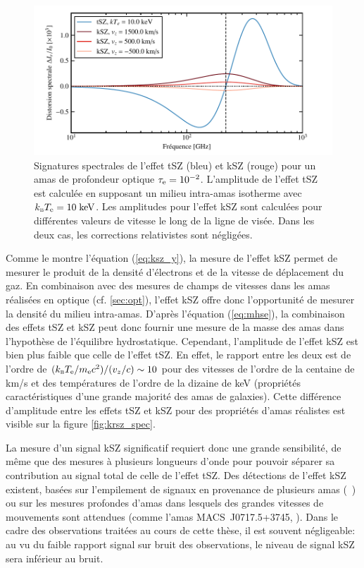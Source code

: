 \begin{figure}[t]
    \centering
    \includegraphics[width=.8\linewidth]{Figures/Chap_amas/tSZ_kSZ_spectrum.pdf}
    \caption{
        Signatures spectrales de l'effet tSZ (bleu) et kSZ (rouge) pour un amas de profondeur optique $\tau_{\rm e} = 10^{-2}$.
        L'amplitude de l'effet tSZ est calculée en supposant un milieu intra-amas isotherme avec $k_\textsc{b} T_{\rm e} = 10\;{\rm keV}$.
        Les amplitudes pour l'effet kSZ sont calculées pour différentes valeurs de vitesse le long de la ligne de visée.
        Dans les deux cas, les corrections relativistes sont négligées.
    }
    \label{fig:ksz_spec}
\end{figure}

Comme le montre l'équation (\ref{eq:ksz_y}), la mesure de l'effet kSZ permet de mesurer le produit de la densité d'électrons et de la vitesse de déplacement du gaz.
En combinaison avec des mesures de champs de vitesses dans les amas réalisées en optique (cf. \ref{sec:opt}), l'effet kSZ offre donc l'opportunité de mesurer la densité du milieu intra-amas.
D'après l'équation (\ref{eq:mhse}), la combinaison des effets tSZ et kSZ peut donc fournir une mesure de la masse des amas dans l'hypothèse de l'équilibre hydrostatique.
Cependant, l'amplitude de l'effet kSZ est bien plus faible que celle de l'effet tSZ.
En effet, le rapport entre les deux est de l'ordre de $(k_\textsc{b} T_{\rm e} / m_{\rm e} c^2) / (v_z / c) \sim 10$ pour des vitesses de l'ordre de la centaine de km/s et des températures de l'ordre de la dizaine de keV (propriétés caractéristiques d'une grande majorité des amas de galaxies).
Cette différence d'amplitude entre les effets tSZ et kSZ pour des propriétés d'amas réalistes est visible sur la figure \ref{fig:krsz_spec}.

La mesure d'un signal kSZ significatif requiert donc une grande sensibilité, de même que des mesures à plusieurs longueurs d'onde pour pouvoir séparer sa contribution au signal total de celle de l'effet tSZ.
Des détections de l'effet kSZ existent, basées sur l'empilement de signaux en provenance de plusieurs amas (\eg\ \cite{hand_evidence_2012}) ou sur les mesures profondes d'amas dans lesquels des grandes vitesses de mouvements sont attendues (comme l'amas MACS~J0717.5+3745, \cite{mroczkowski_multi-wavelength_2012, adam_mapping_2017-1}).
Dans le cadre des observations traitées au cours de cette thèse, il est souvent négligeable: au vu du faible rapport signal sur bruit des observations, le niveau de signal kSZ sera inférieur au bruit.

